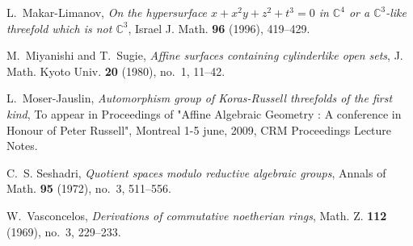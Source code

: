 \documentclass[10pt,oneside,english]{amsart}
\numberwithin{equation}{section}
\numberwithin{figure}{section}
\theoremstyle{plain}
\theoremstyle{remark}
\theoremstyle{plain}
\theoremstyle{plain}
\theoremstyle{definition}
\begin{document}
\begin{thebibliography}{10}
L.~Makar-Limanov, \emph{On the hypersurface $x + x^2 y + z^2 + t^3 = 0$ in
  $\mathbb{C}^4$ or a $\mathbb{C}^3$-like threefold which is not
  $\mathbb{C}^3$}, Israel J. Math. \textbf{96} (1996), 419--429.

M.~Miyanishi and T.~Sugie, \emph{Affine surfaces containing cylinderlike open
  sets}, J. Math. Kyoto Univ. \textbf{20} (1980), no.~1, 11--42.

L.~Moser-Jauslin, \emph{Automorphism group of {K}oras-{R}ussell threefolds of
  the first kind}, To appear in {P}roceedings of "{A}ffine {A}lgebraic
  {G}eometry : {A} conference in Honour of {P}eter {R}ussell", {M}ontreal 1-5
  june, 2009, CRM Proceedings Lecture Notes.

C.~S. Seshadri, \emph{Quotient spaces modulo reductive algebraic groups},
  Annals of Math. \textbf{95} (1972), no.~3, 511--556.

W.~Vasconcelos, \emph{Derivations of commutative noetherian rings}, Math. Z.
  \textbf{112} (1969), no.~3, 229--233.

\end{thebibliography}
\end{document}
